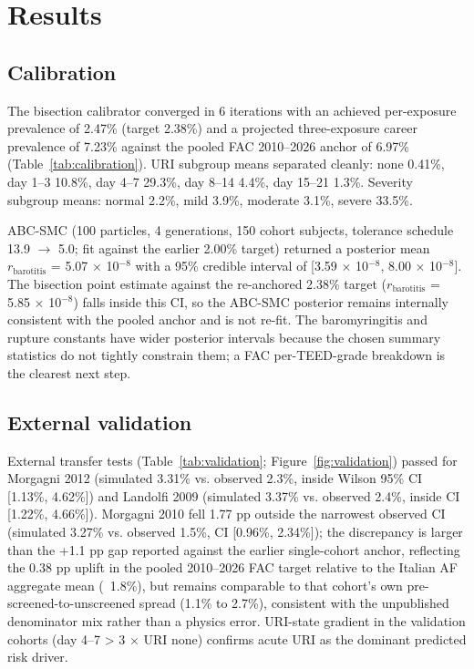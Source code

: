 \documentclass[11pt,a4paper]{article}
\begin{document}
\section{Results}

\subsection{Calibration}

The bisection calibrator converged in 6 iterations with an achieved per-exposure prevalence of 2.47\% (target 2.38\%) and a projected three-exposure career prevalence of 7.23\% against the pooled FAC 2010--2026 anchor of 6.97\% (Table~\ref{tab:calibration}). URI subgroup means separated cleanly: none 0.41\%, day 1--3 10.8\%, day 4--7 29.3\%, day 8--14 4.4\%, day 15--21 1.3\%. Severity subgroup means: normal 2.2\%, mild 3.9\%, moderate 3.1\%, severe 33.5\%.

ABC-SMC (100 particles, 4 generations, 150 cohort subjects, tolerance schedule 13.9 $\rightarrow$ 5.0; fit against the earlier 2.00\% target) returned a posterior mean $r_{\mathrm{barotitis}}$ = 5.07 $\times$ 10$^{-8}$ with a 95\% credible interval of [3.59 $\times$ 10$^{-8}$, 8.00 $\times$ 10$^{-8}$]. The bisection point estimate against the re-anchored 2.38\% target ($r_{\mathrm{barotitis}}$ = 5.85 $\times$ 10$^{-8}$) falls inside this CI, so the ABC-SMC posterior remains internally consistent with the pooled anchor and is not re-fit. The baromyringitis and rupture constants have wider posterior intervals because the chosen summary statistics do not tightly constrain them; a FAC per-TEED-grade breakdown is the clearest next step.

\subsection{External validation}

External transfer tests (Table~\ref{tab:validation}; Figure~\ref{fig:validation}) passed for Morgagni 2012 (simulated 3.31\% vs. observed 2.3\%, inside Wilson 95\% CI [1.13\%, 4.62\%]) and Landolfi 2009 (simulated 3.37\% vs. observed 2.4\%, inside CI [1.22\%, 4.66\%]). Morgagni 2010 fell 1.77 pp outside the narrowest observed CI (simulated 3.27\% vs. observed 1.5\%, CI [0.96\%, 2.34\%]); the discrepancy is larger than the +1.1 pp gap reported against the earlier single-cohort anchor, reflecting the 0.38 pp uplift in the pooled 2010--2026 FAC target relative to the Italian AF aggregate mean (~1.8\%), but remains comparable to that cohort's own pre-screened-to-unscreened spread (1.1\% to 2.7\%), consistent with the unpublished denominator mix rather than a physics error. URI-state gradient in the validation cohorts (day 4--7 > 3 $\times$ URI none) confirms acute URI as the dominant predicted risk driver.
\end{document}
